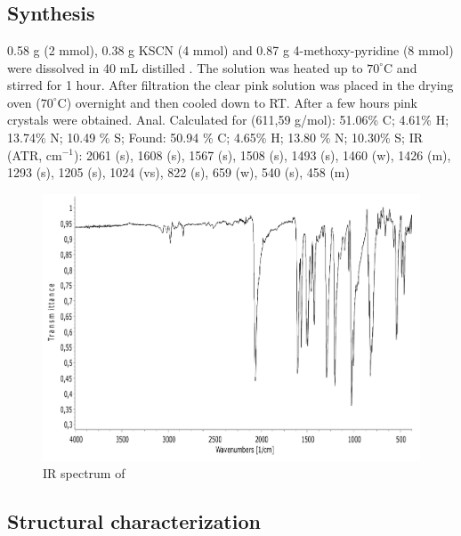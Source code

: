 \section{}
\subsection{Synthesis}
0.58 g  (2 mmol), 0.38 g KSCN (4 mmol) and 0.87 g 4-methoxy-pyridine (8 mmol) were dissolved in 40 mL distilled . The solution was heated up to $70^\circ$C  and stirred for 1 hour. After filtration the clear pink solution was placed in the drying oven ($70^\circ$C) overnight and then cooled down to RT. After a few hours pink crystals were obtained.
Anal. Calculated for  (611,59 g/mol): 51.06\% C; 4.61\% H; 13.74\% N; 10.49 \% S;
Found: 50.94 \% C; 4.65\% H; 13.80 \% N; 10.30\% S;
IR (ATR, cm$^{-1}$): 2061 (s), 1608 (s), 1567 (s), 1508 (s), 1493 (s), 1460 (w), 1426 (m), 1293 (s), 1205 (s), 1024 (vs), 822 (s), 659 (w), 540 (s), 458 (m)

\begin{figure}[h!]
\centering
\includegraphics[width=1\textwidth]{figures/CoR4MOP-IR.pdf}
\caption{IR spectrum of }
\end{figure}





\subsection{Structural characterization}

